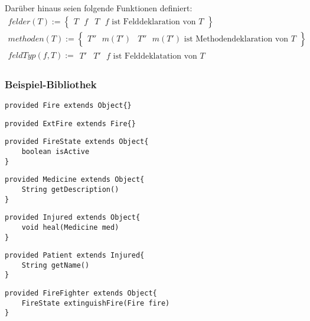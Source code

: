 Darüber hinaus seien folgende Funktionen definiert:
\begin{gather*}
\mathit{felder(T)} :=  \left\{ 
				\begin{array}{l|l}
					T \texttt{ }\mathit{f} & T \texttt{ }\mathit{f}\text{ ist Felddeklaration von }T
				\end{array}
              \right\}\\
\mathit{methoden(T)} := \left\{ 
				\begin{array}{l|l}
					T'' \text{ }m(T') & T'' \text{ }m(T') \text{ ist Methodendeklaration von }T
				\end{array}
              \right\}\\
\mathit{feldTyp(f,T)} := 
				\begin{array}{l|l}
					T' & T' \texttt{ }\mathit{f}\text{ ist Felddeklatation von }T
				\end{array}              
\end{gather*}

\subsubsection{Beispiel-Bibliothek}



\begin{lstlisting}[style = dsl]
provided Fire extends Object{}
\end{lstlisting}

\begin{lstlisting}[style = dsl]
provided ExtFire extends Fire{}
\end{lstlisting}


\begin{lstlisting}[style = dsl]
provided FireState extends Object{
	boolean isActive
}
\end{lstlisting}

\begin{lstlisting}[style = dsl]
provided Medicine extends Object{
	String getDescription()
}
\end{lstlisting}

\begin{lstlisting}[style = dsl]
provided Injured extends Object{
	void heal(Medicine med)	
}
\end{lstlisting}


\begin{lstlisting}[style = dsl]
provided Patient extends Injured{
	String getName()
}
\end{lstlisting}
\begin{lstlisting}[style = dsl]
provided FireFighter extends Object{
	FireState extinguishFire(Fire fire)
}
\end{lstlisting}

